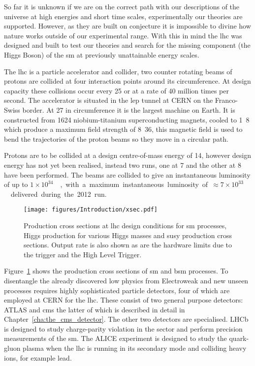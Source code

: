 So far it is unknown if we are on the correct path with our descriptions of 
the universe at high energies and short time scales, experimentally our 
theories are supported. However, as they are built on conjecture it is impossible to divine how nature works outside of our experimental range.
With this in mind the \ac{lhc} was designed and built to test our theories and 
search for the missing component (the Higgs Boson) of the \ac{sm} at previously 
unattainable energy scales.

The \ac{lhc} is a particle accelerator and collider, two counter 
rotating beams of protons are collided at four interaction points around its 
circumference. At design capacity these collisions occur every 
\unit{25}{\nano\second} or at a rate of 40 million times per second.
The accelerator is situated in the \ac{lep} tunnel at CERN on the 
Franco-Swiss border. At \unit{27}{\kilo\meter} in circumference it is the 
largest machine on Earth. It is constructed from 1624 niobium-titanium 
superconducting magnets, cooled to \unit{1.8}{\kelvin} which produce a maximum 
field strength of \unit{8.36}{\tesla}, this magnetic field is used to bend the 
trajectories of the proton beams so they move in a circular path.

Protons are to be collided at a design centre-of-mass energy of 
\unit{14}{\TeV}, however design energy has not yet been realised, instead two 
runs, one at \unit{7}{\TeV} and the other at \unit{8}{\TeV} have been 
performed. The beams are collided to give an instantaneous luminosity of up to 
\unit{$1\times10^{34}$}{\lumiunits}, with a maximum instantaneous luminosity of 
\unit{$\approx 7 \times 10^{33}$}{\lumiunits} delivered during the 2012 run.



\begin{figure}[ht]
  \centering
    \texttt{[image: figures/Introduction/xsec.pdf]}
  \caption{Production cross sections at \ac{lhc} design conditions for \ac{sm} processes, Higgs production for various Higgs masses and \ac{susy} production cross sections. Output rate is also shown as are the hardware limits due to the \Lone trigger and the High Level Trigger\cite{productionxsecs}.}
  \label{fig:figures_Introduction_xsec}
\end{figure}

Figure~\ref{fig:figures_Introduction_xsec} shows the production cross sections 
of \ac{sm} and \ac{bsm} processes. To disentangle the already discovered 
low \pt physics from Electroweak and new unseen processes requires 
highly sophisticated particle detectors, four of which are employed at CERN for 
the \ac{lhc}. These consist of two general purpose detectors: 
ATLAS\cite{ref:atlas} and \ac{cms}\cite{ref:cms} the latter of which is 
described in detail in Chapter~\ref{cha:the_cms_detector}. The other two 
detectors are specialised. LHCb\cite{ref:lhcb} is designed to study 
charge-parity violation in the \Pbottom sector and perform precision 
measurements of the \ac{sm}. The ALICE\cite{ref:alice} experiment is designed to 
study the quark-gluon plasma when the \ac{lhc} is running in its secondary 
mode and colliding heavy ions, for example lead.



